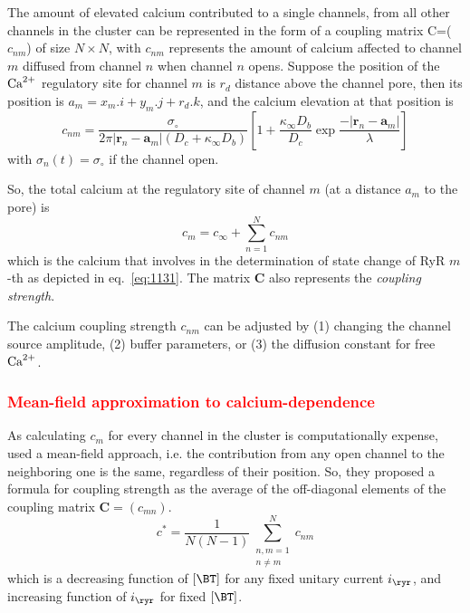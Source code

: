 The amount of elevated calcium contributed to a single channels, from all other
channels in the cluster can be represented in the form of a
coupling matrix C=($c_{nm}$) of size  $N\times N$, with $c_{nm}$ represents
the amount of calcium affected to channel $m$ diffused from channel
$n$ when channel $n$ opens. %
Suppose the position of the ${\text{Ca}^{2+}}$ regulatory site for channel $m$ is
$r_d$ distance above the channel pore, then its position is
$a_m=x_m.i+y_m.j+r_d.k$, and the calcium elevation at that position is
\begin{equation}
  \label{eq:1147}
  c_{nm}=\frac{\sigma_\circ}{2\pi|\mathbf{r}_n-\mathbf{a}_m|(D_c+\kappa_\infty
    D_b)}\left[1+\frac{\kappa_\infty D_b}{D_c}\exp\frac{-|\mathbf{r}_n-\mathbf{a}_m|}{\lambda}\right]
\end{equation}
with $\sigma_n(t)=\sigma_\circ$ if the channel open.

So, the total calcium at the regulatory site of channel $m$ (at a distance
$a_m$ to the pore) is
\begin{equation}
  \label{eq:1148}
  c_m = c_\infty + \sum^N_{n=1} c_{nm}
\end{equation}
which is the calcium that involves in the determination of state change
of RyR $m$-th as depicted in eq.~\eqref{eq:1131}. The matrix $\mathbf{C}$
also represents the {\it coupling strength}.

\begin{framed}
  The calcium coupling strength $c_{nm}$ can be adjusted by (1)
  changing the channel source amplitude, (2) buffer parameters, or (3)
  the diffusion constant for free ${\text{Ca}^{2+}}$.
\end{framed}

\subsubsection{\textcolor{red}{\bf Mean-field approximation to
calcium-dependence}}

As calculating $c_m$ for every channel in the cluster is computationally
expense, ~\citep{groff2008} used a mean-field approach, i.e. the
contribution from any open channel to the neighboring one is the same,
regardless of their position. So, they proposed a formula for coupling strength
as the average of the off-diagonal elements of the coupling matrix $\mathbf{C}=(c_{mn})$.
\begin{equation}
  \label{eq:1149}
  c^* = \frac{1}{N(N-1)}\sum^N_{
    \begin{array}{l}
      n,m=1\\
      n\ne m
    \end{array}
  }
  c_{nm}
\end{equation}
which is a decreasing function of $[\BT]$ for any fixed unitary
current $i_\ryr$, and increasing function of $i_\ryr$ for fixed
$[\BT]$.

